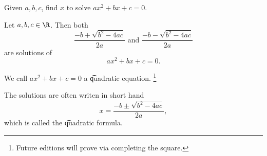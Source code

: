 
Given $a, b, c$, find $x$ to solve $ax^2 + bx + c = 0$.

\begin{proposition}
Let $a, b, c \in \R$. Then both
  \[
\frac{-b + \sqrt{b^2 - 4ac}}{2a} \text{ and } \frac{-b - \sqrt{b^2 - 4ac}}{2a}
  \]
are solutions of
  \[
ax^2 + bx + c = 0.
  \]
\end{proposition}
We call $ax^2 + bx + c = 0$ a \t{quadratic equation}.
  \ifhmode\unskip\fi\footnote{
Future editions will prove via completing the square.
  }

The solutions are often writen in short hand
  \[
x = \frac{-b \pm \sqrt{b^2 - 4ac}}{2a},
  \]
which is called the \t{quadratic formula}.
\blankpage
